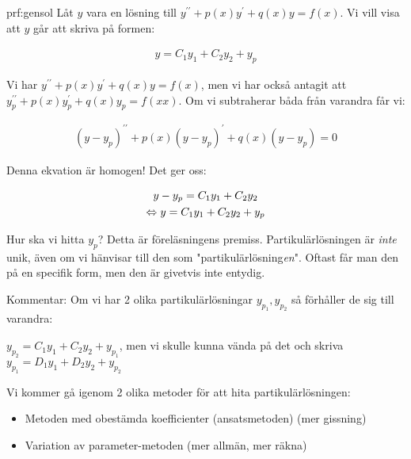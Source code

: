 \begin{prf}{prf:gensol}
  Låt $y$ vara en lösning till $y^{\prime\prime}+p(x)y^{\prime}+q(x)y=f(x)$. Vi vill visa att $y$ går att skriva på formen:

  \begin{equation*}
    \begin{gathered}
      y = C_1y_1+C_2y_2 +y_p
    \end{gathered}
  \end{equation*}
  \par\bigskip
  \noindent Vi har $y^{\prime\prime}+p(x)y^{\prime}+q(x)y=f(x)$, men vi har också antagit att $y_p^{\prime\prime}+p(x)y_p^{\prime}+q(x)y_p = f(xx)$. Om vi subtraherar båda från varandra får vi:


  \begin{equation*}
    \begin{gathered}
      (y-y_p)^{\prime\prime}+p(x)(y-y_p)^{\prime}+q(x)(y-y_p)=0
    \end{gathered}
  \end{equation*}
  \par\bigskip
  \noindent Denna ekvation är homogen! Det ger oss:


  \begin{equation*}
    \begin{gathered}
      y-y_p = C_1y_1+C_2y_2\\
      \Leftrightarrow y=C_1y_1+C_2y_2+y_p
    \end{gathered}
  \end{equation*}
\end{prf}
\par\bigskip
\noindent Hur ska vi hitta $y_p$? Detta är föreläsningens premiss. Partikulärlösningen är \textit{inte} unik, även om vi hänvisar till den som "partikulärlösning\textit{en}". Oftast får man den på en specifik form, men den är givetvis inte entydig.
\par\bigskip
\noindent Kommentar: Om vi har 2 olika partikulärlösningar $y_{p_1}, y_{p_2}$ så förhåller de sig till varandra:\par\noindent $y_{p_2} = C_1y_1+C_2y_2+y_{p_1}$, men vi skulle kunna vända på det och skriva $y_{p_1}=D_1y_1+D_2y_2+y_{p_2}$
\par\bigskip
\noindent Vi kommer gå igenom 2 olika metoder för att hita partikulärlösningen:

\begin{itemize}
  \item Metoden med obestämda koefficienter (ansatsmetoden) (mer gissning)
  \item Variation av parameter-metoden (mer allmän, mer räkna)
\end{itemize}
\par\bigskip

